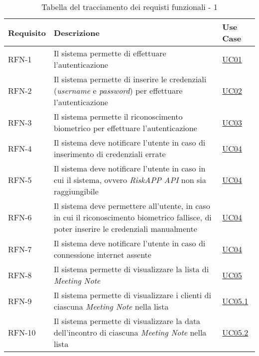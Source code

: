 \begin{table}%
\caption{Tabella del tracciamento dei requisti funzionali - 1}
\label{tab:requisiti-funzionali-1}
\begin{tabularx}{\textwidth}{lXl}
\hline\hline
\textbf{Requisito} & \textbf{Descrizione} & \textbf{Use Case}\\
\hline
RFN-1 \label{RFN-1} & Il sistema permette di effettuare l'autenticazione & \hyperref[UC01]{UC01} \\
\hline
RFN-2 \label{RFN-2} & Il sistema permette di inserire le credenziali (\emph{username} e \emph{password}) per effettuare l'autenticazione & \hyperref[UC02]{UC02} \\
\hline
RFN-3 \label{RFN-3} & Il sistema permette il riconoscimento biometrico per effettuare l'autenticazione & \hyperref[UC03]{UC03} \\
\hline
RFN-4 \label{RFN-4} & Il sistema deve notificare l'utente in caso di inserimento di credenziali errate & \hyperref[UC04]{UC04} \\ %
\hline
RFN-5 \label{RFN-5} & Il sistema deve notificare l'utente in caso in cui il sistema, ovvero \emph{RiskAPP API} non sia raggiungibile & \hyperref[UC04]{UC04} \\ %
\hline
RFN-6 \label{RFN-6} & Il sistema deve permettere all'utente, in caso in cui il riconoscimento biometrico fallisce, di poter inserire le credenziali manualmente & \hyperref[UC04]{UC04} \\
\hline
RFN-7 \label{RFN-7} & Il sistema deve notificare l'utente in caso di connessione internet assente & \hyperref[UC04]{UC04} \\ %
\hline
RFN-8 \label{RFN-8} & Il sistema permette di visualizzare la lista di \emph{Meeting Note} & \hyperref[UC05]{UC05} \\
\hline
RFN-9 \label{RFN-9} & Il sistema permette di visualizzare i clienti di ciascuna \emph{Meeting Note} nella lista & \hyperref[UC05.1]{UC05.1} \\
\hline
RFN-10 \label{RFN-10} & Il sistema permette di visualizzare la data dell'incontro di ciascuna \emph{Meeting Note} nella lista & \hyperref[UC05.2]{UC05.2} \\

\end{tabularx}
\end{table}
